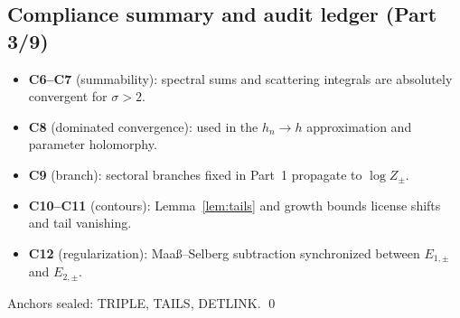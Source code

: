 
\subsection{Compliance summary and audit ledger (Part 3/9)}
\label{subsec:ch6-part3-compliance} \relax \hspace{0pt}
\begin{remark}
\label{rem:part3-compliance}
\begin{itemize}[leftmargin=7mm]
\item \textbf{C6–C7} (summability): spectral sums and scattering integrals are absolutely convergent for $\sigma>2$.
\item \textbf{C8} (dominated convergence): used in the $h_n\to h$ approximation and parameter holomorphy.
\item \textbf{C9} (branch): sectoral branches fixed in Part~1 propagate to $\log Z_\pm$.
\item \textbf{C10–C11} (contours): Lemma~\ref{lem:tails} and growth bounds license shifts and tail vanishing.
\item \textbf{C12} (regularization): Maaß–Selberg subtraction synchronized between $E_{1,\pm}$ and $E_{2,\pm}$.
\end{itemize}
Anchors sealed: \textsf{TRIPLE}, \textsf{TAILS}, \textsf{DETLINK}. \qed %
\end{remark}


